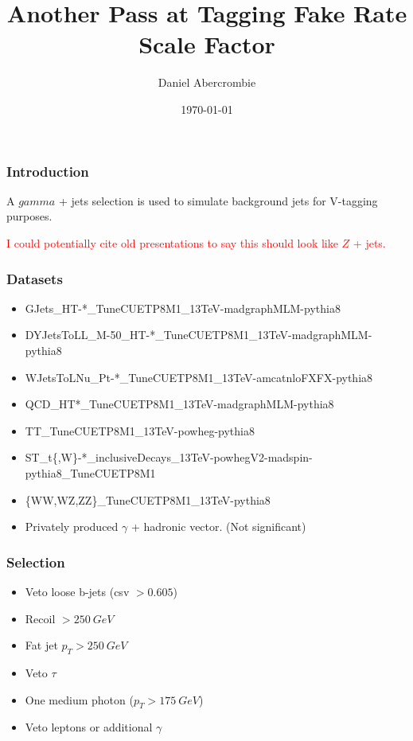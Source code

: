 \documentclass{beamer}
\author[D. Abercrombie]{
  Daniel Abercrombie
}
\title{\bf \sffamily Another Pass at Tagging Fake Rate Scale Factor}
\date{\today}
\begin{document}
\begin{frame}[nonumbering]
  \titlepage
\end{frame}

\begin{frame}
  \frametitle{Introduction}
  A $gamma$ + jets selection is used to simulate background jets for V-tagging purposes.

  \textcolor{red}{I could potentially cite old presentations to say this should look like $Z$ + jets.}
\end{frame}



\begin{frame}
  \frametitle{Datasets}
  {\scriptsize
    \begin{itemize}
    \item GJets\_HT-*\_TuneCUETP8M1\_13TeV-madgraphMLM-pythia8
    \item DYJetsToLL\_M-50\_HT-*\_TuneCUETP8M1\_13TeV-madgraphMLM-pythia8
    \item WJetsToLNu\_Pt-*\_TuneCUETP8M1\_13TeV-amcatnloFXFX-pythia8
    \item QCD\_HT*\_TuneCUETP8M1\_13TeV-madgraphMLM-pythia8
    \item TT\_TuneCUETP8M1\_13TeV-powheg-pythia8
    \item ST\_t\{,W\}-*\_inclusiveDecays\_13TeV-powhegV2-madspin-pythia8\_TuneCUETP8M1
    \item \{WW,WZ,ZZ\}\_TuneCUETP8M1\_13TeV-pythia8
    \item Privately produced $\gamma$ + hadronic vector. (Not significant)
    \end{itemize}
  }

\end{frame}

\begin{frame}
  \frametitle{Selection}
  \begin{itemize}
  \item Veto loose b-jets (csv $> 0.605$)
  \item Recoil $> \SI{250}{GeV}$
  \item Fat jet $p_T > \SI{250}{GeV}$
  \item Veto $\tau$
  \item One medium photon ($p_T > \SI{175}{GeV}$)
  \item Veto leptons or additional $\gamma$
  \end{itemize}
\end{frame}
\end{document}
